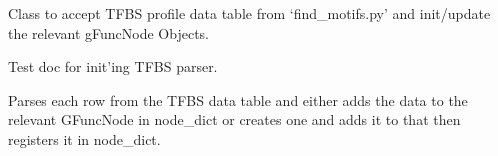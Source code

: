 \documentclass[letterpaper,10pt,english]{sphinxmanual}
\begin{document}
\begin{fulllineitems}
\label{code:gfunc.parsers.JASPAR.BasicTFBSParser}
Class to accept TFBS profile data table from `find\_motifs.py' and init/update the relevant gFuncNode Objects.

\begin{fulllineitems}
\label{code:gfunc.parsers.JASPAR.BasicTFBSParser.__init__}
Test doc for init'ing TFBS parser.

\end{fulllineitems}


\begin{fulllineitems}
\label{code:gfunc.parsers.JASPAR.BasicTFBSParser.resgister_nodes_and_edges}
Parses each row from the TFBS data table and either adds the data to the relevant
GFuncNode in node\_dict or creates one and adds it to that then registers it in node\_dict.

\end{fulllineitems}


\end{fulllineitems}

\end{document}
